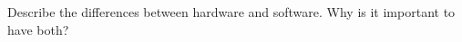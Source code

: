 



\exercisesection

\begin{exercise}
    Describe the differences between hardware and software. Why is it important to have both?
\end{exercise}

